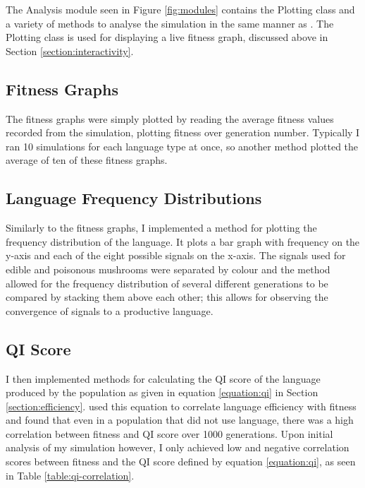 \documentclass[12pt,a4paper,twoside,openright]{report}
\begin{document}
The Analysis module seen in Figure \ref{fig:modules} contains the Plotting class and a variety of methods to analyse the simulation in the same manner as \citet{Cangelosi1998}. The Plotting class is used for displaying a live fitness graph, discussed above in Section \ref{section:interactivity}.

\subsection{Fitness Graphs}

The fitness graphs were simply plotted by reading the average fitness values recorded from the simulation, plotting fitness over generation number. Typically I ran 10 simulations for each language type at once, so another method plotted the average of ten of these fitness graphs.

\subsection{Language Frequency Distributions}

Similarly to the fitness graphs, I implemented a method for plotting the frequency distribution of the language. It plots a bar graph with frequency on the y-axis and each of the eight possible signals on the x-axis. The signals used for edible and poisonous mushrooms were separated by colour and the method allowed for the frequency distribution of several different generations to be compared by stacking them above each other; this allows for observing the convergence of signals to a productive language.

\subsection{QI Score}

I then implemented methods for calculating the QI score of the language produced by the population as given in equation \ref{equation:qi} in Section \ref{section:efficiency}. \citet{Cangelosi1998} used this equation to correlate language efficiency with fitness and found that even in a population that did not use language, there was a high correlation between fitness and QI score over 1000 generations. Upon initial analysis of my simulation however, I only achieved low and negative correlation scores between fitness and the QI score defined by equation \ref{equation:qi}, as seen in Table \ref{table:qi-correlation}.
\end{document}
